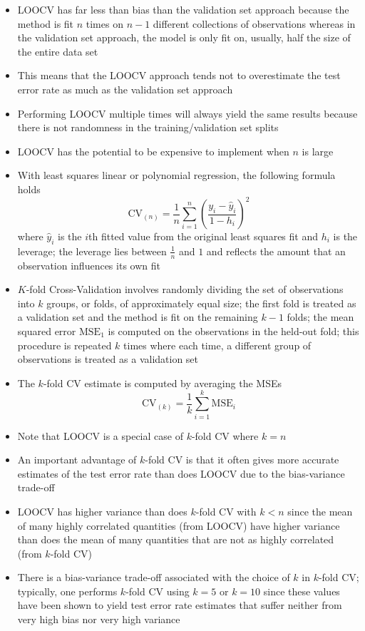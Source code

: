 \documentclass[12pt]{article}
\begin{document}
\begin{itemize}
\item LOOCV has far less than bias than the validation set approach because the method is fit $n$ times on $n-1$ different collections of observations whereas in the validation set approach, the model is only fit on, usually, half the size of the entire data set 
\item This means that the LOOCV approach tends not to overestimate the test error rate as much as the validation set approach
\item Performing LOOCV multiple times will always yield the same results because there is not randomness in the training/validation set splits 
\item LOOCV has the potential to be expensive to implement when $n$ is large 
\item With least squares linear or polynomial regression, the following formula holds $$ \text{CV}_{(n)} = \frac{1}{n}\sum_{i=1}^n \left( \frac{y_i - \hat{y}_i}{1-h_i}\right)^2 $$ where $\hat{y}_i$ is the $i$th fitted value from the original least squares fit and $h_i$ is the leverage; the leverage lies between $\frac{1}{n}$ and $1$ and reflects the amount that an observation influences its own fit 
\item $K$-fold Cross-Validation involves randomly dividing the set of observations into $k$ groups, or folds, of approximately equal size; the first fold is treated as a validation set and the method is fit on the remaining $k-1$ folds; the mean squared error $\text{MSE}_1$ is computed on the observations in the held-out fold; this procedure is repeated $k$ times where each time, a different group of observations is treated as a validation set 
\item The $k$-fold CV estimate is computed by averaging the MSEs $$ \text{CV}_{(k)} = \frac{1}{k}\sum_{i=1}^k \text{MSE}_i $$ 
\item Note that LOOCV is a special case of $k$-fold CV where $k=n$
\item An important advantage of $k$-fold CV is that it often gives more accurate estimates of the test error rate than does LOOCV due to the bias-variance trade-off 
\item LOOCV has higher variance than does $k$-fold CV with $k<n$ since the mean of many highly correlated quantities (from LOOCV) have higher variance than does the mean of many quantities that are not as highly correlated (from $k$-fold CV)
\item There is a bias-variance trade-off associated with the choice of $k$ in $k$-fold CV; typically, one performs $k$-fold CV using $k=5$ or $k=10$ since these values have been shown to yield test error rate estimates that suffer neither from very high bias nor very high variance 

\end{itemize}
\end{document}
